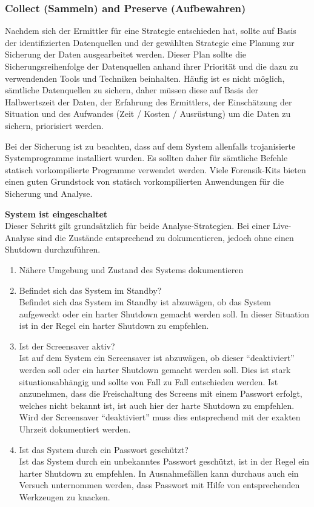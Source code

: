 \subsubsection{Collect (Sammeln) and Preserve (Aufbewahren)} \label{subsubsec:FA:Secure:CollectPreserve}
Nachdem sich der Ermittler für eine Strategie entschieden hat, sollte auf Basis der identifizierten Datenquellen und der gewählten Strategie eine Planung zur Sicherung der Daten ausgearbeitet werden. Dieser Plan sollte die Sicherungsreihenfolge der Datenquellen anhand ihrer Priorität und die dazu zu verwendenden Tools und Techniken beinhalten. Häufig ist es nicht möglich, sämtliche Datenquellen zu sichern, daher müssen diese auf Basis der Halbwertszeit der Daten, der Erfahrung des Ermittlers, der Einschätzung der Situation und des Aufwandes (Zeit / Kosten / Ausrüstung) um die Daten zu sichern,  priorisiert werden.

Bei der Sicherung ist zu beachten, dass auf dem System allenfalls trojanisierte Systemprogramme installiert wurden. Es sollten daher für sämtliche Befehle statisch vorkompilierte  Programme verwendet werden. Viele Forensik-Kits bieten einen guten Grundstock von statisch vorkompilierten Anwendungen für die Sicherung und Analyse.

\textbf{System ist eingeschaltet}\\
Dieser Schritt gilt grundsätzlich für beide Analyse-Strategien. Bei einer Live-Analyse sind die Zustände entsprechend zu dokumentieren, jedoch ohne einen Shutdown durchzuführen. 

\begin{enumerate}
\item Nähere Umgebung und Zustand des Systems dokumentieren
\item Befindet sich das System im Standby? \\
Befindet sich das System im Standby ist abzuwägen, ob das System aufgeweckt oder ein harter Shutdown gemacht werden soll. In dieser Situation ist in der Regel ein harter Shutdown  zu empfehlen.
\item Ist der Screensaver aktiv? \\
Ist auf dem System ein Screensaver ist abzuwägen, ob dieser "`deaktiviert"' werden soll oder ein harter Shutdown gemacht werden soll. Dies ist stark situationsabhängig und sollte von Fall zu Fall entschieden werden. Ist anzunehmen, dass die Freischaltung des Screens mit einem Passwort erfolgt, welches nicht bekannt ist, ist auch hier der harte Shutdown zu empfehlen. Wird der Screensaver "`deaktiviert"' muss dies entsprechend mit der exakten Uhrzeit dokumentiert werden.
\item Ist das System durch ein Passwort geschützt? \\
Ist das System durch ein unbekanntes Passwort geschützt, ist in der Regel ein harter Shutdown zu empfehlen. In Ausnahmefällen kann durchaus auch ein Versuch unternommen werden, dass Passwort mit Hilfe von entsprechenden Werkzeugen zu knacken.
\end{enumerate}

